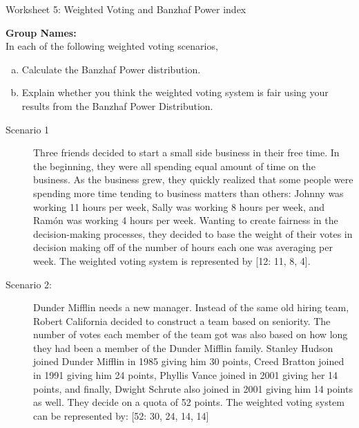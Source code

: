 \documentclass[12pt]{article}
\begin{document}
\begin{center}
{\Large  Worksheet 5:  Weighted Voting and Banzhaf Power index 	}
\end{center}



\noindent \textbf{Group Names:} \hrulefill \\

In each of the following weighted voting scenarios,
\begin{enumerate}[(a)]
\item	Calculate the Banzhaf Power distribution.
\item 	Explain whether you think the weighted voting system is fair using your results from the Banzhaf Power Distribution.
\end{enumerate}

\begin{description}
\item[Scenario 1] Three friends decided to start a small side business in their free time. In the beginning, they were all spending equal amount of time on the business. As the business grew, they quickly realized that some people were spending more time tending to business matters than others: Johnny was working 11 hours per week, Sally was working 8 hours per week, and Ram\'on was working 4 hours per week.
Wanting to create fairness in the decision-making processes, they decided to base the weight of their votes in decision making off of the number of hours each one was averaging per week. The weighted voting system is represented by [12: 11, 8, 4].


\vfill

\newpage

\item[Scenario 2:] Dunder Mifflin needs a new manager. Instead of the same old hiring team, Robert California decided to construct a team based on seniority. The number of votes each member of the team got was also based on how long they had been a member of the Dunder Mifflin family. Stanley Hudson joined Dunder Mifflin in 1985 giving him 30 points, Creed Bratton joined in 1991 giving him 24 points, Phyllis Vance joined in 2001 giving her 14 points, and finally, Dwight Schrute also joined in 2001 giving him 14 points as well.
They decide on a quota of 52 points. The weighted voting system can be represented by:
[52: 30, 24, 14, 14]


\vfill


    
    \end{description}
\end{document}
